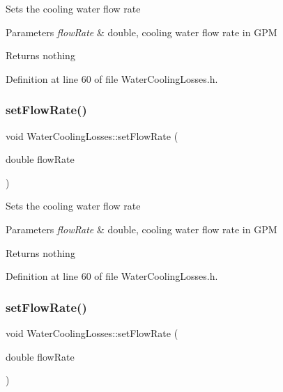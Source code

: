Sets the cooling water flow rate


\begin{DoxyParams}{Parameters}
{\em flow\+Rate} & double, cooling water flow rate in G\+PM\\
\hline
\end{DoxyParams}
\begin{DoxyReturn}{Returns}
nothing 
\end{DoxyReturn}


Definition at line 60 of file Water\+Cooling\+Losses.\+h.

\mbox{\label{class_water_cooling_losses_abf4d64d9261818af331613791374d42f}} 
\subsubsection{\texorpdfstring{set\+Flow\+Rate()}{setFlowRate()}\hspace{0.1cm}{\footnotesize\ttfamily [2/3]}}
{\footnotesize\ttfamily void Water\+Cooling\+Losses\+::set\+Flow\+Rate (\begin{DoxyParamCaption}\item[{double}]{flow\+Rate }\end{DoxyParamCaption})\hspace{0.3cm}{\ttfamily [inline]}}

Sets the cooling water flow rate


\begin{DoxyParams}{Parameters}
{\em flow\+Rate} & double, cooling water flow rate in G\+PM\\
\hline
\end{DoxyParams}
\begin{DoxyReturn}{Returns}
nothing 
\end{DoxyReturn}


Definition at line 60 of file Water\+Cooling\+Losses.\+h.

\mbox{\label{class_water_cooling_losses_abf4d64d9261818af331613791374d42f}} 
\subsubsection{\texorpdfstring{set\+Flow\+Rate()}{setFlowRate()}\hspace{0.1cm}{\footnotesize\ttfamily [3/3]}}
{\footnotesize\ttfamily void Water\+Cooling\+Losses\+::set\+Flow\+Rate (\begin{DoxyParamCaption}\item[{double}]{flow\+Rate }\end{DoxyParamCaption})\hspace{0.3cm}{\ttfamily [inline]}}

